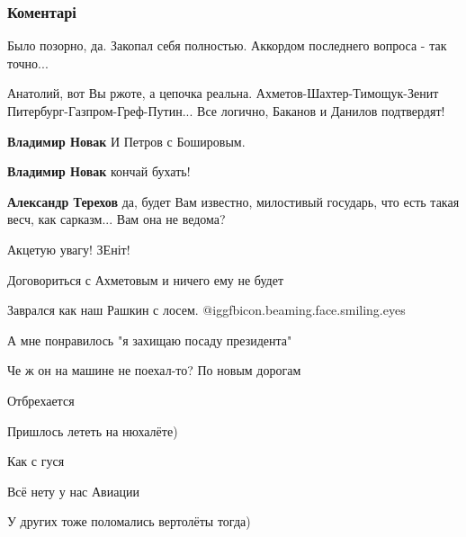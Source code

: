  
 
 
 
 
\subsubsection{Коментарі}

\begin{itemize} %
Было позорно, да. Закопал себя полностью. Аккордом последнего вопроса - так точно...


Анатолий, вот Вы ржоте, а цепочка реальна. Ахметов-Шахтер-Тимощук-Зенит
Питербург-Газпром-Греф-Путин... Все логично, Баканов и Данилов подтвердят!

\begin{itemize} %
\textbf{Владимир Новак} И Петров с Бошировым.

\textbf{Владимир Новак} кончай бухать!

\textbf{Александр Терехов} да, будет Вам известно, милостивый государь, что есть такая весч, как сарказм... Вам она не ведома?

Акцетую увагу! ЗЕніт!
\end{itemize} %

Договориться с Ахметовым и ничего ему не будет

Заврался как наш Рашкин с лосем.  @igg{fbicon.beaming.face.smiling.eyes} 

А мне понравилось "я захищаю посаду президента"

Че ж он на машине не поехал-то? По новым дорогам

Отбрехается

Пришлось лететь на нюхалёте)

Как с гуся

Всё нету у нас Авиации

У других тоже поломались вертолёты тогда)


\end{itemize}
